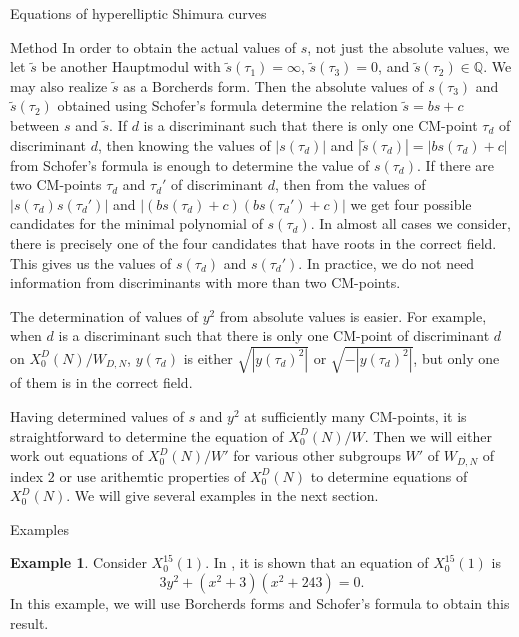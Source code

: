 \documentclass{amsart}
\newcounter{lemma}
\theoremstyle{definition}
\newtheorem{Example}[lemma]{Example}
\def\Q{\mathbb Q}
\def\wt{\widetilde}
\begin{document}
\begin{section}{Equations of hyperelliptic Shimura curves}
\begin{subsection}{Method}
In order to obtain the actual values of $s$,
not just the absolute values, we let $\wt s$ be another Hauptmodul
with $\wt s(\tau_1)=\infty$, $\wt s(\tau_3)=0$, and $\wt
s(\tau_2)\in\Q$. We may also realize $\wt s$ as a Borcherds
form. Then the absolute values of $s(\tau_3)$ and $\wt s(\tau_2)$
obtained using Schofer's formula determine the relation $\wt s=bs+c$
between $s$ and $\wt s$. If $d$ is a discriminant such that there is
only one CM-point $\tau_d$ of discriminant $d$, then knowing the
values of $|s(\tau_d)|$ and $|\wt s(\tau_d)|=|bs(\tau_d)+c|$ from
Schofer's formula is enough to determine the value of $s(\tau_d)$. If
there are two CM-points $\tau_d$ and $\tau_d'$ of discriminant $d$,
then from the values of $|s(\tau_d)s(\tau_d')|$ and
$|(bs(\tau_d)+c)(bs(\tau_d')+c)|$ we get four possible candidates for
the minimal polynomial of $s(\tau_d)$. In almost all cases we
consider, there is precisely one of the four candidates that have
roots in the correct field. This gives us the values of $s(\tau_d)$
and $s(\tau_d')$. In practice, we do not need information from
discriminants with more than two CM-points.

The determination of values of $y^2$ from absolute values is easier.
For example, when $d$ is a discriminant such that there is only one
CM-point of discriminant $d$ on $X_0^D(N)/W_{D,N}$, $y(\tau_d)$ is
either $\sqrt{|y(\tau_d)^2|}$ or $\sqrt{-|y(\tau_d)^2|}$, but only one
of them is in the correct field.

Having determined values of $s$ and $y^2$ at sufficiently many
CM-points, it is straightforward to determine the equation of
$X_0^D(N)/W$. Then we will either work out equations of $X_0^D(N)/W'$
for various other subgroups $W'$ of $W_{D,N}$ of index $2$ or use
arithemtic properties of $X_0^D(N)$ to determine equations of
$X_0^D(N)$. We will give several examples in the next section.
\end{subsection}

\begin{subsection}{Examples}

\begin{Example} Consider $X_0^{15}(1)$. In \cite[Proposition
  3.2.1]{Jordan}, it is shown that an equation of $X_0^{15}(1)$ is
  $$
    3y^2+(x^2+3)(x^2+243)=0.
  $$
  In this example, we will use Borcherds forms and Schofer's formula
  to obtain this result.


\end{Example}
\end{subsection}
\end{section}
\end{document}
